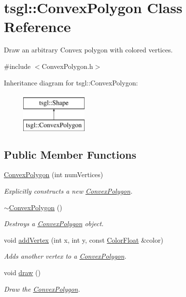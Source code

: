 \hypertarget{classtsgl_1_1_convex_polygon}{\section{tsgl\-:\-:Convex\-Polygon Class Reference}
\label{classtsgl_1_1_convex_polygon}
}


Draw an arbitrary Convex polygon with colored vertices.  




{\ttfamily \#include $<$Convex\-Polygon.\-h$>$}

Inheritance diagram for tsgl\-:\-:Convex\-Polygon\-:\begin{figure}[H]
\begin{center}
\leavevmode
\includegraphics[height=2.000000cm]{classtsgl_1_1_convex_polygon}
\end{center}
\end{figure}
\subsection*{Public Member Functions}
\begin{DoxyCompactItemize}
\item 
\hyperlink{classtsgl_1_1_convex_polygon_ae9d826f3b3155fe84016e6efbcbd2b64}{Convex\-Polygon} (int num\-Vertices)
\begin{DoxyCompactList}\small\item\em Explicitly constructs a new \hyperlink{classtsgl_1_1_convex_polygon}{Convex\-Polygon}. \end{DoxyCompactList}\item 
\hyperlink{classtsgl_1_1_convex_polygon_a46a5bde76d6843d47c754a04cc847e64}{$\sim$\-Convex\-Polygon} ()
\begin{DoxyCompactList}\small\item\em Destroys a \hyperlink{classtsgl_1_1_convex_polygon}{Convex\-Polygon} object. \end{DoxyCompactList}\item 
void \hyperlink{classtsgl_1_1_convex_polygon_a60d17a5ac80a796d05dfeff855791cc0}{add\-Vertex} (int x, int y, const \hyperlink{structtsgl_1_1_color_float}{Color\-Float} \&color)
\begin{DoxyCompactList}\small\item\em Adds another vertex to a \hyperlink{classtsgl_1_1_convex_polygon}{Convex\-Polygon}. \end{DoxyCompactList}\item 
void \hyperlink{classtsgl_1_1_convex_polygon_add4d4971a5d22385eebbfe771af916b5}{draw} ()
\begin{DoxyCompactList}\small\item\em Draw the \hyperlink{classtsgl_1_1_convex_polygon}{Convex\-Polygon}. \end{DoxyCompactList}\end{DoxyCompactItemize}

